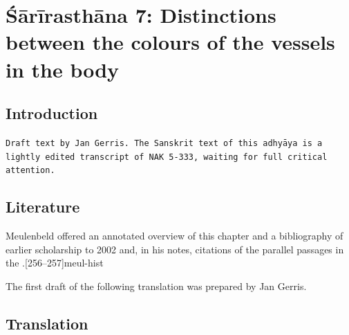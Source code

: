 
\chapter{Śārīrasthāna 7:  Distinctions between the colours of the vessels in the body}


\section{Introduction}
\texttt{Draft text by Jan Gerris.
    The Sanskrit text of this adhyāya is a lightly 
    edited transcript of NAK 5-333,
    waiting for full critical attention.}

\section{Literature} 

Meulenbeld offered an annotated overview of this chapter and a
bibliography of earlier scholarship to 2002 and, in his notes, citations
of the parallel passages in the \CS.[256--257]{meul-hist}   

The first draft of the following translation was prepared by Jan
Gerris.

\newpage

\section{Translation}

